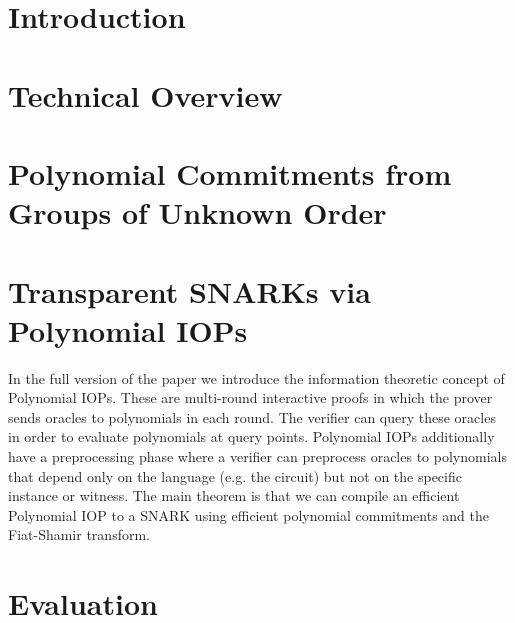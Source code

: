 \documentclass[12pt]{article}
\theoremstyle{definition}
\begin{document}
\section{Introduction}
 
\section{Technical Overview}\label{sec:overview} 


\section{Polynomial Commitments from Groups of Unknown Order}
\label{sec:protocol}


%
\section{Transparent SNARKs via Polynomial IOPs}
\label{sec:polyiop}
In the full version of the paper we introduce the information theoretic concept of Polynomial IOPs. These are multi-round interactive proofs in which the prover sends oracles to polynomials in each round. The verifier can query these oracles in order to evaluate polynomials at query points. Polynomial IOPs additionally have a preprocessing phase where a verifier can preprocess oracles to polynomials that depend only on the language (e.g. the circuit) but not on the specific instance or witness. The main theorem is that we can compile an efficient Polynomial IOP to a SNARK using efficient polynomial commitments and the Fiat-Shamir transform.  
\section{Evaluation}

\pagebreak
%


{\footnotesize
  }
\end{document}
